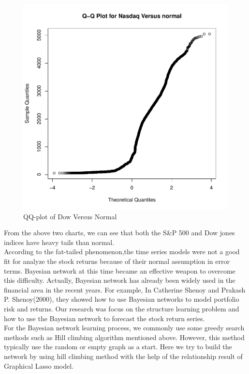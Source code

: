 \documentclass[12pt]{article}
\theoremstyle{plain}
\begin{document}
\begin{figure}[!htb]
\centering
\includegraphics[scale=0.50]{nasdaq.pdf}
\caption{\label{graph:pdf1} QQ-plot of Dow Versus Normal}
\end{figure}

From the above two charts, we can see that both the S\&P 500 and Dow jones indices have heavy tails than normal. \\
 According to the fat-tailed phenomenon,the time series models were not a good fit for analyze the stock returns because of their normal assumption in error terms. Bayesian network at this time became an effective weapon to overcome this difficulty. Actually, Bayesian network has already been widely used in the financial area in the recent years. For example, In Catherine Shenoy and Prakash P. Shenoy(2000), they showed how to use Bayesian networks to model portfolio risk and returns. Our research was focus on  the structure learning problem and how to use the Bayesian network to forecast the stock return series.\\
 For the Bayesian network learning process, we commonly use some greedy search methods such as Hill climbing algorithm mentioned above. However, this method typically use the random or empty graph as a start. Here we try to build the network by using hill climbing method with the help of the relationship result of Graphical Lasso model. \\
\end{document}
